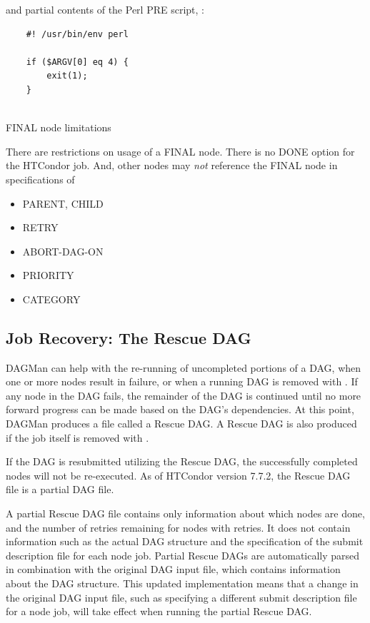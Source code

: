 and partial contents of the Perl PRE script, :
\begin{verbatim}
    #! /usr/bin/env perl
    
    if ($ARGV[0] eq 4) {
        exit(1);
    }
   
\end{verbatim}


\begin{description}
\item[FINAL node limitations]
\end{description}

There are restrictions on usage of a FINAL node.
There is no DONE option for the HTCondor job.
And, other nodes may \emph{not} reference the FINAL node in specifications of 
\begin{itemize}
\item PARENT, CHILD
\item RETRY
\item ABORT-DAG-ON
\item PRIORITY
\item CATEGORY
\end{itemize}

\subsection{\label{sec:DAGMan-rescue}Job Recovery:  The Rescue DAG}

DAGMan can help with the re-running of uncompleted portions of a DAG, 
when one or more nodes result in failure,
or when a running DAG is removed with .
If any node in the DAG fails,
the remainder of the DAG is continued until no more forward
progress can be made based on the DAG's dependencies.
At this point, DAGMan produces a file called a Rescue DAG.  
A Rescue DAG is also produced if the
 job itself is removed with .

If the DAG is resubmitted utilizing the Rescue DAG,
the successfully completed nodes will not be re-executed.
As of HTCondor version 7.7.2, the Rescue DAG file is a partial DAG file. 

A partial Rescue DAG file contains only information about which nodes are done,
and the number of retries remaining for nodes with retries.  
It does not contain information such as the actual
DAG structure and the specification of the submit description file 
for each node job.  
Partial Rescue DAGs are automatically parsed in combination with
the original DAG input file, 
which contains information about the DAG structure.  
This updated implementation means that a change in the original DAG input file,
such as specifying a different submit description file for a node job,
will take effect when running the partial Rescue DAG.

